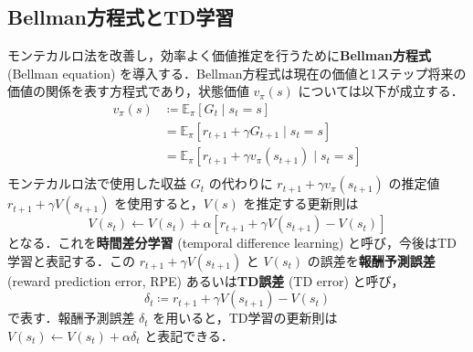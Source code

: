 \subsection{Bellman方程式とTD学習}
モンテカルロ法を改善し，効率よく価値推定を行うために\textbf{Bellman方程式} (Bellman equation) を導入する．Bellman方程式は現在の価値と1ステップ将来の価値の関係を表す方程式であり，状態価値 $v_\pi(s)$ については以下が成立する．
\begin{align}
v_\pi(s) &\coloneqq  \mathbb{E}_\pi \left[G_t \mid s_t = s \right]\\
&= \mathbb{E}_\pi \left[r_{t+1} + \gamma G_{t+1} \mid s_t = s \right]\\
&= \mathbb{E}_\pi \left[r_{t+1} + \gamma v_\pi(s_{t+1}) \mid s_t = s \right]\\
\end{align}
モンテカルロ法で使用した収益 $G_t$ の代わりに $r_{t+1} + \gamma v_\pi(s_{t+1})$ の推定値 $r_{t+1} + \gamma V(s_{t+1})$ を使用すると，$V(s)$ を推定する更新則は 
\begin{equation}
V(s_t)\leftarrow V(s_t)+\alpha \left[r_{t+1} + \gamma V(s_{t+1}) - V(s_t)\right]
\end{equation}
となる．これを\textbf{時間差分学習} (temporal difference learning) と呼び，今後はTD学習と表記する．この $r_{t+1} + \gamma V(s_{t+1})$ と $V(s_t)$ の誤差を\textbf{報酬予測誤差} (reward prediction error, RPE) あるいは\textbf{TD誤差} (TD error) と呼び，
\begin{equation}
\delta_t \coloneqq  r_{t+1} + \gamma V(s_{t+1}) - V(s_t)
\end{equation}
で表す．報酬予測誤差 $\delta_t$ を用いると，TD学習の更新則は $V(s_t)\leftarrow V(s_t)+\alpha \delta_t$ と表記できる．
